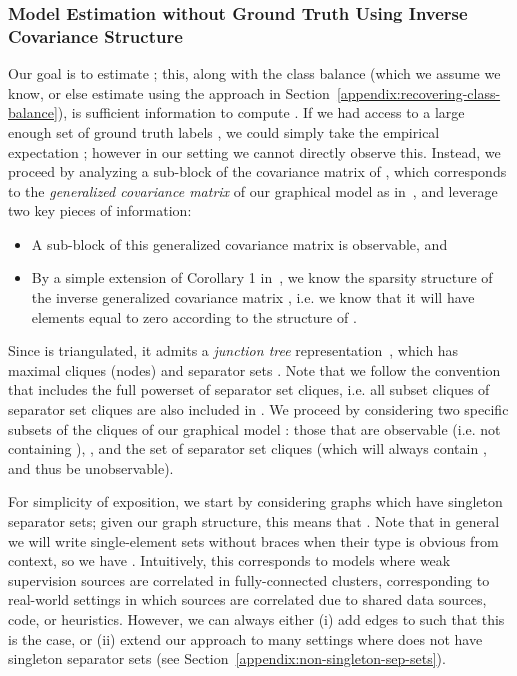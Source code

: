 \documentclass[letterpaper]{article}
\begin{document}
\begin{appendix}
\subsubsection{Model Estimation without Ground Truth Using Inverse Covariance Structure}
\label{appendix:model-estimation}
Our goal is to estimate ; this, along with the class balance  (which we assume we know, or else estimate using the approach in Section~\ref{appendix:recovering-class-balance}), is sufficient information to compute .
If we had access to a large enough set of ground truth labels , we could simply take the empirical expectation ; however in our setting we cannot directly observe this.
Instead, we proceed by analyzing a sub-block of the covariance matrix of , which corresponds to the \textit{generalized covariance matrix} of our graphical model as in~\cite{loh2012structure}, and leverage two key pieces of information:
\begin{itemize}
	\item A sub-block of this generalized covariance matrix is observable, and
\item By a simple extension of Corollary 1 in~\cite{loh2012structure}, we know the sparsity structure of the inverse generalized covariance matrix , i.e. we know that it will have elements equal to zero according to the structure of .
\end{itemize}
Since  is triangulated, it admits a \textit{junction tree} representation~\cite{koller2009probabilistic}, which has maximal cliques (nodes)  and separator sets .
Note that we follow the convention that  includes the full powerset of separator set cliques, i.e. all subset cliques of separator set cliques are also included in .
We proceed by considering two specific subsets of the cliques of our graphical model : those that are observable (i.e. not containing ), , and the set of separator set cliques (which will always contain , and thus be unobservable).

For simplicity of exposition, we start by considering graphs  which have singleton separator sets; given our graph structure, this means that .
Note that in general we will write single-element sets without braces when their type is obvious from context, so we have .
Intuitively, this corresponds to models where weak supervision sources are correlated in fully-connected clusters, corresponding to real-world settings in which sources are correlated due to shared data sources, code, or heuristics.
However, we can always either (i) add edges to  such that this is the case, or (ii) extend our approach to many settings where  does not have singleton separator sets (see Section~\ref{appendix:non-singleton-sep-sets}).


\end{appendix}
\end{document}
